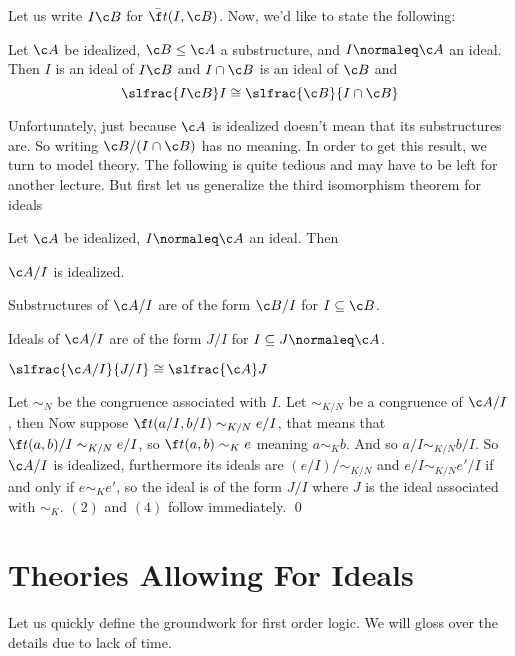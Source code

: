 Let us write $I\c B$ for $\bar{\f t}(I,\c B)$.
Now, we'd like to state the following:

\bthrm[title=The Idealized Second Isomorphism Theorem]

    Let $\c A$ be idealized, $\c B\leq\c A$ a substructure, and $I\normaleq\c A$ an ideal.
    Then $I$ is an ideal of $I\c B$ and $I\cap\c B$ is an ideal of $\c B$ and
    $$ \slfrac{I\c B}I \cong \slfrac{\c B}{I\cap\c B} $$

\ethrm

Unfortunately, just because $\c A$ is idealized doesn't mean that its substructures are.
So writing $\c B/(I\cap\c B)$ has no meaning.
In order to get this result, we turn to model theory.
The following is quite tedious and may have to be left for another lecture.
But first let us generalize the third isomorphism theorem for ideals

\bthrm[title=The Idealized Third Isomorphism Theorem]

    Let $\c A$ be idealized, $I\normaleq\c A$ an ideal.
    Then
    \benum
        \item $\c A/I$ is idealized.
        \item Substructures of $\c A/I$ are of the form $\c B/I$ for $I\subseteq\c B$.
        \item Ideals of $\c A/I$ are of the form $J/I$ for $I\subseteq J\normaleq\c A$.
        \item $\slfrac{\c A/I}{J/I}\cong\slfrac{\c A}J$
    \eenum

\ethrm

\Proof Let $\sim_N$ be the congruence associated with $I$.
Let $\sim_{K/N}$ be a congruence of $\c A/I$, then
Now suppose $\f t(a/I,b/I)\sim_{K/N} e/I$, that means that $\f t(a,b)/I\sim_{K/N} e/I$, so $\f t(a,b)\sim_Ke$ meaning $a\sim_Kb$.
And so $a/I\sim_{K/N} b/I$.
So $\c A/I$ is idealized, furthermore its ideals are $(e/I)/{\sim_{K/N}}$ and $e/I\sim_{K/N}e'/I$ if and only if $e\sim_Ke'$, so the ideal is of the form $J/I$ where $J$ is the ideal associated with
$\sim_K$.
$(2)$ and $(4)$ follow immediately.
\qed

\section{Theories Allowing For Ideals}

Let us quickly define the groundwork for first order logic.
We will gloss over the details due to lack of time.

\bdefn

